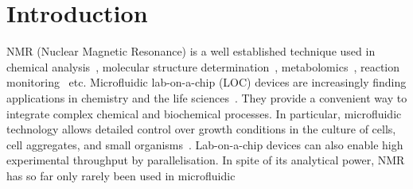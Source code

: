\documentclass[preprint,5p]{elsarticle}
\begin{document}
\section{Introduction}	
\label{sec:intro}
NMR (Nuclear Magnetic Resonance) is a well established technique used in chemical 
analysis~\cite{NMR-chemical-1995, hills1994magnetic, rabenstein1991quantitative},
molecular structure determination~\cite{wuthrich1990protein}, metabolomics~\cite{nmr-metabolomics-future-2017,nmr-metabolomics-2016}, reaction 
monitoring~\cite{maiwald2004quantitative} etc. Microfluidic lab-on-a-chip (LOC) devices 
are increasingly finding applications in chemistry and the life 
sciences~\cite{whitesides2006origins,mark2010microfluidic}. 
They provide a convenient way to integrate complex chemical and biochemical processes. 
In particular, microfluidic technology allows detailed control over growth conditions 
in the culture of cells, cell aggregates, and small organisms~\cite{cellonchip-2006,cellonchip-review,tissueonchip-2008}. 
Lab-on-a-chip devices can also enable high experimental 
throughput by parallelisation. 
In spite of its analytical power, NMR has so far only rarely been used in microfluidic 
\end{document}
